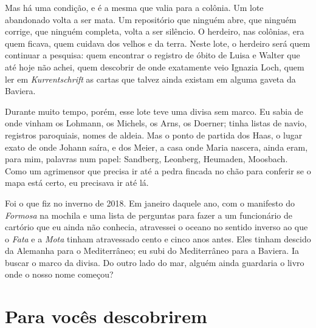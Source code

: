 \documentclass[
  brazilian,
  11pt,
  openany]{book}
\begin{document}
Mas há uma condição, e é a mesma que valia para a colônia. Um lote
abandonado volta a ser mata. Um repositório que ninguém abre, que
ninguém corrige, que ninguém completa, volta a ser silêncio. O herdeiro,
nas colônias, era quem ficava, quem cuidava dos velhos e da terra. Neste
lote, o herdeiro será quem continuar a pesquisa: quem encontrar o
registro de óbito de Luisa e Walter que até hoje não achei, quem
descobrir de onde exatamente veio Ignazia Loch, quem ler em
\emph{Kurrentschrift} as cartas que talvez ainda existam em alguma
gaveta da Baviera.

Durante muito tempo, porém, esse lote teve uma divisa sem marco. Eu
sabia de onde vinham os Lohmann, os Michels, os Arns, os Doerner; tinha
listas de navio, registros paroquiais, nomes de aldeia. Mas o ponto de
partida dos Haas, o lugar exato de onde Johann saíra, e dos Meier, a
casa onde Maria nascera, ainda eram, para mim, palavras num papel:
Sandberg, Leonberg, Heumaden, Moosbach. Como um agrimensor que precisa
ir até a pedra fincada no chão para conferir se o mapa está certo, eu
precisava ir até lá.

Foi o que fiz no inverno de 2018. Em janeiro daquele ano, com o
manifesto do \emph{Formosa} na mochila e uma lista de perguntas para
fazer a um funcionário de cartório que eu ainda não conhecia, atravessei
o oceano no sentido inverso ao que o \emph{Fata} e a \emph{Mota} tinham
atravessado cento e cinco anos antes. Eles tinham descido da Alemanha
para o Mediterrâneo; eu subi do Mediterrâneo para a Baviera. Ia buscar o
marco da divisa. Do outro lado do mar, alguém ainda guardaria o livro
onde o nosso nome começou?

\section{Para vocês descobrirem}\label{para-vocuxeas-descobrirem-14}
\end{document}
